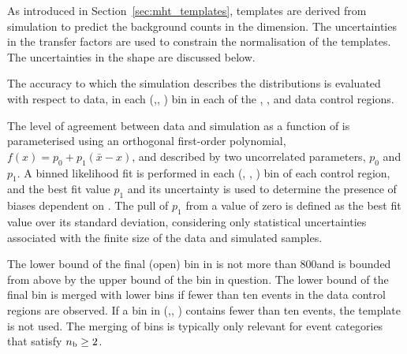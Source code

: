 
As introduced in Section~\ref{sec:mht_templates}, templates are
derived from simulation to predict the background counts in the
\HTmiss dimension. The uncertainties in the transfer factors are used
to constrain the normalisation of the \HTmiss templates. The
uncertainties in the \HTmiss shape are discussed below.


The accuracy to which the simulation describes the \HTmiss distributions
is evaluated with respect to data, in each (\njet,\nb, \scalht) bin in
each of the \mj, \mmj, and \gj data control regions. 

The level of agreement between data and simulation as a function of
\HTmiss is parameterised using an orthogonal first-order polynomial,
$f(x) = p_0 + p_1(\bar{x}-x)$, and described by two uncorrelated
parameters, $p_0$ and $p_1$. A binned likelihood fit is performed in
each (\njet, \nb, \scalht) bin of each control region, and the best
fit value $p_1$ and its uncertainty is used to determine the presence
of biases dependent on \HTmiss. The pull of $p_1$ from a value of zero
is defined as the best fit value over its standard deviation,
considering only statistical uncertainties associated with the finite
size of the data and simulated samples.

The lower bound of the final (open) bin in \HTmiss is not more than
800\GeV and is bounded from above by the upper bound of the \scalht
bin in question. The lower bound of the final \HTmiss bin is merged
with lower bins if fewer than ten events in the data control regions
are observed. If a bin in (\njet,\nb, \scalht) contains fewer than ten
events, the \HTmiss template is not used. The merging of bins is
typically only relevant for event categories that satisfy $n_{\text{b}} \geq
2$.

